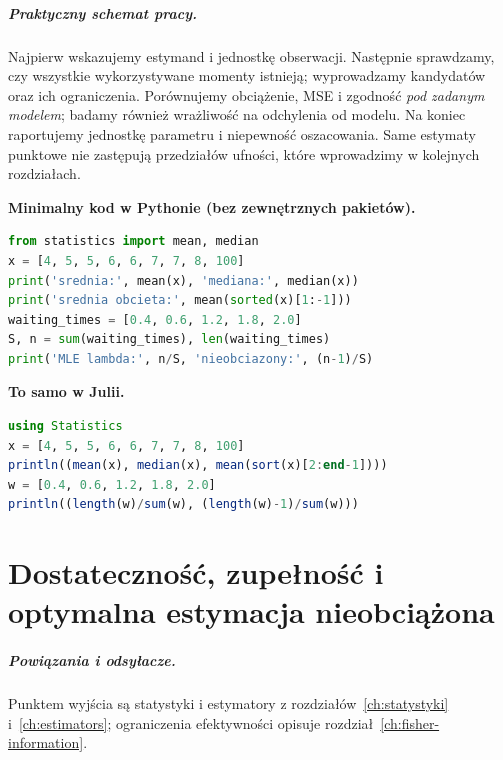 \documentclass[11pt,a4paper,oneside]{report}
\numberwithin{equation}{chapter}
\theoremstyle{plain}
\theoremstyle{definition}
\theoremstyle{remark}
\begin{document}
\paragraph{Praktyczny schemat pracy.}
Najpierw wskazujemy estymand i jednostkę obserwacji. Następnie
sprawdzamy, czy wszystkie wykorzystywane momenty istnieją;
wyprowadzamy kandydatów oraz ich ograniczenia. Porównujemy obciążenie,
MSE i zgodność \emph{pod zadanym modelem}; badamy również wrażliwość
na odchylenia od modelu. Na koniec raportujemy jednostkę parametru
i niepewność oszacowania. Same estymaty punktowe nie zastępują
przedziałów ufności, które wprowadzimy w kolejnych rozdziałach.

\noindent\textbf{Minimalny kod w Pythonie (bez zewnętrznych pakietów).}\par
\par
{}
\smallskip
\begin{lstlisting}[language=Python,caption={Porównanie statystyk odpornych i estymatorów intensywności (Python).}]
from statistics import mean, median
x = [4, 5, 5, 6, 6, 7, 7, 8, 100]
print('srednia:', mean(x), 'mediana:', median(x))
print('srednia obcieta:', mean(sorted(x)[1:-1]))
waiting_times = [0.4, 0.6, 1.2, 1.8, 2.0]
S, n = sum(waiting_times), len(waiting_times)
print('MLE lambda:', n/S, 'nieobciazony:', (n-1)/S)
\end{lstlisting}
\noindent\textbf{To samo w Julii.}\par
\par
{}
\smallskip
\begin{lstlisting}[language=Julia,caption={Średnia obcięta i estymatory intensywności (Julia).}]
using Statistics
x = [4, 5, 5, 6, 6, 7, 7, 8, 100]
println((mean(x), median(x), mean(sort(x)[2:end-1])))
w = [0.4, 0.6, 1.2, 1.8, 2.0]
println((length(w)/sum(w), (length(w)-1)/sum(w)))
\end{lstlisting}


\chapter{Dostateczność, zupełność i optymalna estymacja nieobciążona}
\label{ch:sufficiency}
\paragraph{Powiązania i odsyłacze.} Punktem wyjścia są statystyki i estymatory z rozdziałów~\ref{ch:statystyki} i~\ref{ch:estimators}; ograniczenia efektywności opisuje rozdział~\ref{ch:fisher-information}.
\end{document}
